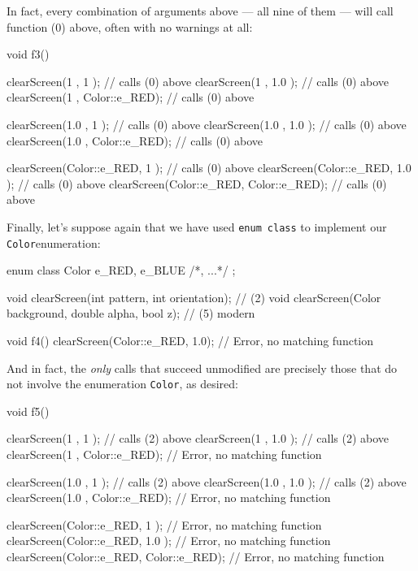 \noindent In fact, every combination of arguments above --- all nine of them ---
will call function (0) above, often with no warnings at all:

\begin{emcppslisting}[emcppsbatch=e9]
void f3()
{
    clearScreen(1           , 1           );  // calls (0) above
    clearScreen(1           , 1.0         );  // calls (0) above
    clearScreen(1           , Color::e_RED);  // calls (0) above

    clearScreen(1.0         , 1           );  // calls (0) above
    clearScreen(1.0         , 1.0         );  // calls (0) above
    clearScreen(1.0         , Color::e_RED);  // calls (0) above

    clearScreen(Color::e_RED, 1           );  // calls (0) above
    clearScreen(Color::e_RED, 1.0         );  // calls (0) above
    clearScreen(Color::e_RED, Color::e_RED);  // calls (0) above
}
\end{emcppslisting}

\noindent Finally, let's suppose again that we have used
\lstinline!enum!~\lstinline!class! to implement our \lstinline!Color!\linebreak[4]
\mbox{enumeration}:

\begin{emcppshiddenlisting}[emcppsbatch=e10]
enum class Color { e_RED, e_BLUE /*, ...*/ };
\end{emcppshiddenlisting}
\begin{emcppslisting}[emcppsbatch=e10]
void clearScreen(int pattern, int orientation);            // (2)
void clearScreen(Color background, double alpha, bool z);  // (5) modern

void f4()
{
    clearScreen(Color::e_RED, 1.0);  // Error, no matching function
}
\end{emcppslisting}

\noindent And in fact, the \emph{only} calls that succeed unmodified are precisely
those that do not involve the enumeration \lstinline!Color!, as desired:

\begin{emcppslisting}[emcppsbatch=e10]
void f5()
{
    clearScreen(1           , 1           );  // calls (2) above
    clearScreen(1           , 1.0         );  // calls (2) above
    clearScreen(1           , Color::e_RED);  // Error, no matching function

    clearScreen(1.0         , 1           );  // calls (2) above
    clearScreen(1.0         , 1.0         );  // calls (2) above
    clearScreen(1.0         , Color::e_RED);  // Error, no matching function

    clearScreen(Color::e_RED, 1           );  // Error, no matching function
    clearScreen(Color::e_RED, 1.0         );  // Error, no matching function
    clearScreen(Color::e_RED, Color::e_RED);  // Error, no matching function
}
\end{emcppslisting}

